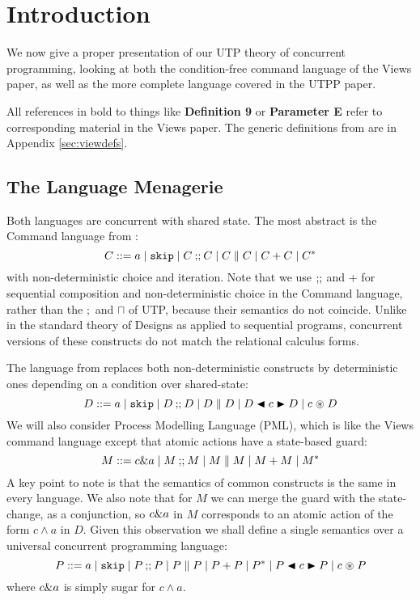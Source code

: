 \section{Introduction}\label{sec:intro}

We now give a proper presentation of our UTP theory
of concurrent programming, looking at both the condition-free command language
of the Views paper\cite{conf/popl/Dinsdale-YoungBGPY13},
as well as the more complete language covered in the UTPP paper\cite{DBLP:conf/icfem/WoodcockH02}.

All references in bold to things
like \textbf{Definition 9} or \textbf{Parameter E} refer to corresponding material
in the Views paper.
The generic definitions from\cite{conf/popl/Dinsdale-YoungBGPY13}
are in Appendix \ref{sec:viewdefs}.

\subsection{The Language Menagerie}

Both languages are concurrent with shared state.
The most abstract is the Command language from \cite{conf/popl/Dinsdale-YoungBGPY13}:
\[
 C ::= a \mid \texttt{skip} \mid C \mathbin{;\!;} C \mid C \parallel C \mid C+C \mid C^*
\]
with non-deterministic choice and iteration.
Note that we use $\mathbin{;\!;}$ and $+$ for sequential composition
and non-deterministic choice in the Command language,
rather than the $;$ and $\sqcap$ of UTP,
because their semantics do not coincide.
Unlike in the standard theory of Designs as applied to sequential programs,
concurrent versions of these constructs do not match the relational
calculus forms.


The language from \cite{DBLP:conf/icfem/WoodcockH02} replaces both
non-deterministic constructs by deterministic ones depending
on a condition over shared-state:
\[
 D ::= a \mid \texttt{skip} \mid D \mathbin{;\!;} D \mid D \parallel D \mid D \mathrel{\blacktriangleleft{c}\blacktriangleright} D \mid c \mathrel{\circledast} D
\]
We will also consider Process Modelling Language
(PML)\cite{DBLP:journals/infsof/AtkinsonWN07},
which is like the Views command language except that atomic actions
have a state-based guard:
\[
 M ::= c \& a \mid M \mathbin{;\!;} M \mid M \parallel M \mid M+M \mid M^*
\]
A key point to note is that the semantics of common constructs is the same
in every language.
We also note that for $M$ we can merge the guard with the state-change,
as a conjunction, so $c \& a$ in $M$ corresponds to an atomic
action of the form $c \land a$ in $D$.
Given this observation we shall define a single semantics over
a universal concurrent programming language:
\[
 P ::= a \mid \texttt{skip} \mid P \mathbin{;\!;} P  \mid P \parallel P
   \mid P+P\mid P^*
   \mid P \mathrel{\blacktriangleleft{c}\blacktriangleright} P \mid c \mathrel{\circledast} P
\]
where $c \& a$ is simply sugar for $c \land a$.

